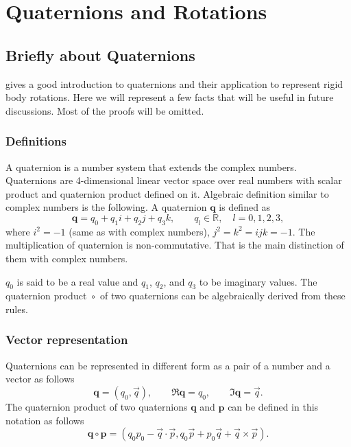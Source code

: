 
\chapter{Quaternions and Rotations}\label{ch:qandrot}

\section{Briefly about Quaternions}

\cite{bib:graf2008quaternions} gives a good introduction to
quaternions and their application to represent rigid body
rotations. Here we will represent a few facts that will be useful in
future discussions. Most of the proofs will be omitted.

\subsection{Definitions}

A quaternion is a number system that extends the complex
numbers. Quaternions are 4-dimensional linear vector space over real
numbers with scalar product and quaternion product defined on
it. Algebraic definition similar to complex numbers is the
following. A quaternion $\bm{q}$ is defined as
\begin{equation}
  \bm{q} = q_0 + q_1 i + q_2 j + q_3 k,\qquad q_l \in \mathbb{R},\quad
  l=0,1,2,3,
\end{equation}
where $i^2=-1$ (same as with complex numbers), $j^2=k^2=ijk=-1$. The
multiplication of quaternion is non-commutative. That is the main
distinction of them with complex numbers.

$q_0$ is said to be a real value and $q_1$, $q_2$, and $q_3$ to be
imaginary values. The quaternion product ${}\circ{}$ of two
quaternions can be algebraically derived from these rules.

\subsection{Vector representation}

Quaternions can be represented in different form as a pair of a number
and a vector as follows
\begin{equation}
  \bm{q} = ( q_0, \vec{q} ), \qquad \Re{\bm{q}} = q_0, \qquad
  \Im{\bm{q}}=\vec{q}.
\end{equation}
The quaternion product of two quaternions $\bm{q}$ and $\bm{p}$ can be
defined in this notation as follows
\begin{equation}\label{eq:quatproduct}
  \bm{q}\circ\bm{p} = (q_0p_0-\vec{q}\cdot\vec{p},
  q_0\vec{p} + p_0\vec{q} + \vec{q}\times\vec{p}).
\end{equation}

